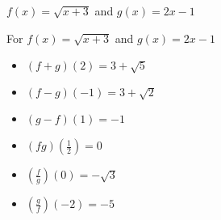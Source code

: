 {$f(x) = \sqrt{x+3}$ and  $g(x) = 2x-1$}
{For $f(x) = \sqrt{x+3}$ and  $g(x) = 2x-1$

\begin{multicols}{2}
\begin{itemize}
\item  $(f+g)(2) = 3+\sqrt{5}$
\item  $(f-g)(-1) = 3+\sqrt{2}$
\item  $(g-f)(1) = -1$
\item  $(fg)\left(\frac{1}{2}\right) = 0$
\item  $\left(\frac{f}{g}\right)(0) = -\sqrt{3}$
\item  $\left(\frac{g}{f}\right)\left(-2\right) = -5$
\end{itemize}
\end{multicols}
}